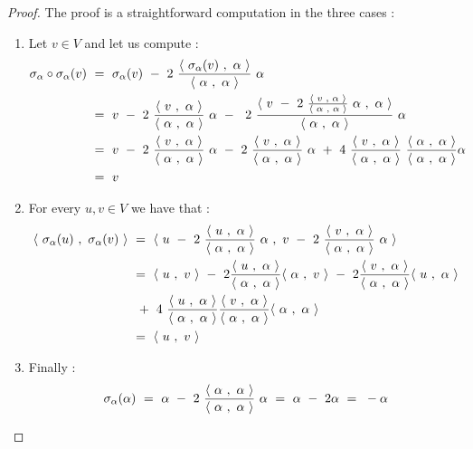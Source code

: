 \begin{proof}
	The proof is a straightforward computation in the three cases :
	\begin{enumerate}
		\item Let $v\in V$ and let us compute :
		\begin{equation}
		\begin{split}
		\sigma_\alpha\circ\sigma_\alpha(v)\qq&=\qq \sigma_\alpha(v)\qq -\qq 2\qq \frac{\prods{\sigma_\alpha(v)}{\alpha}}{\prods{\alpha}{\alpha}}\qq\alpha\\
		&=\qq  v\qq -\qq 2\qq \frac{\prods{v}{\alpha}}{\prods{\alpha}{\alpha}}\qq\alpha \qq -\qq \qq 2\qq \frac{\prods{v\qq -\qq 2\qq \frac{\prods{v}{\alpha}}{\prods{\alpha}{\alpha}}\qq\alpha}{\alpha}}{\prods{\alpha}{\alpha}}\qq\alpha\\
		&=\qq  v\qq -\qq 2\qq \frac{\prods{v}{\alpha}}{\prods{\alpha}{\alpha}}\qq\alpha \qq-\qq 2\qq \frac{\prods{v}{\alpha}}{\prods{\alpha}{\alpha}}\qq\alpha \qq+\qq 4 \qq \frac{\prods{v}{\alpha}}{\prods{\alpha}{\alpha}} \qq \frac{\prods{\alpha}{\alpha}}{\prods{\alpha}{\alpha}}\alpha\\
		&=\qq v
		\end{split}
		\end{equation}
		\item For every $u,v\in V$ we have that :
		\begin{equation}
		\begin{split}
		\prods{\sigma_\alpha(u)}{\sigma_\alpha(v)}\qq&=\qq\prods{ u\qq -\qq 2\qq \frac{\prods{u}{\alpha}}{\prods{\alpha}{\alpha}}\qq\alpha}{ v\qq -\qq 2\qq \frac{\prods{v}{\alpha}}{\prods{\alpha}{\alpha}}\qq\alpha}\\
		&=\qq\prods{u}{v}\qq-\qq 2  \frac{\prods{u}{\alpha}}{\prods{\alpha}{\alpha}} \prods{\alpha}{v}\qq -\qq 2 \frac{\prods{v}{\alpha}}{\prods{\alpha}{\alpha}}\prods{u}{\alpha}\\
		&\qq +\qq 4\qq \frac{\prods{u}{\alpha}}{\prods{\alpha}{\alpha}}\frac{\prods{v}{\alpha}}{\prods{\alpha}{\alpha}}\prods{\alpha}{\alpha}\\
		&=\qq \prods{u}{v}
		\end{split}
		\end{equation}
		\item Finally :
		\begin{equation}
		\sigma_\alpha(\alpha)\qq=\qq \alpha\qq -\qq 2\qq \frac{\prods{\alpha}{\alpha}}{\prods{\alpha}{\alpha}}\qq\alpha\qq=\qq \alpha\qq -\qq 2 \alpha\qq=\qq -\alpha
		\end{equation}
	\end{enumerate}
\end{proof}
